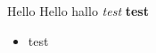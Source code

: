 \documentclass[12pt]{article}
\begin{document}
Hello Hello
hallo
\textit{test}
\textbf{test}
\begin{itemize}
    \item test
\end{itemize}
\end{document}
